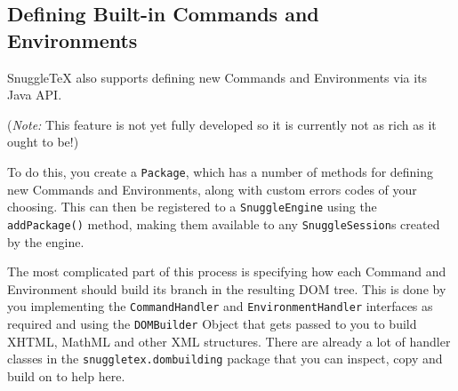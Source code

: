 \subsection*{Defining Built-in Commands and Environments}

SnuggleTeX also supports defining new Commands and Environments via its Java API.

(\emph{Note:} This feature is not yet fully developed so it is currently not as
rich as it ought to be!)

To do this, you create a \verb|Package|, which has a number of methods for
defining new Commands and Environments, along with custom errors codes of your choosing.
This can then be registered to a \verb|SnuggleEngine| using the
\verb|addPackage()| method, making them available to any \verb|SnuggleSession|s
created by the engine.

The most complicated part of this process is specifying how each Command and
Environment should build its branch in the resulting DOM tree. This is done
by you implementing the \verb|CommandHandler| and \verb|EnvironmentHandler| interfaces
as required and using the \verb|DOMBuilder| Object that gets passed
to you to build XHTML, MathML and other XML structures. There are already a lot
of handler classes in the \verb|snuggletex.dombuilding| package that you can
inspect, copy and build on to help here.
